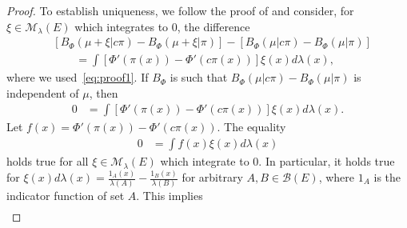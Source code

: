 \documentclass{article}
\newcommand{\cM}{\mathcal M}
\newcommand{\R}{\mathbb R}
\newcommand{\X}{E}
\newcommand{\ssp}[1]{\langle #1 \rangle}
\begin{document}
\begin{proof}
To establish uniqueness, we follow the proof of \citet[Theorem 3.1]{chen2023sampling} and consider, for $\xi\in\cM_\lambda(\X)$ which integrates to 0, the difference
\begin{align*}
     &[B_\Phi(\mu+\xi|c\pi) -B_\Phi(\mu+\xi|\pi)] - [B_\Phi(\mu|c\pi) -B_\Phi(\mu|\pi)]\\
     &\qquad =  \int [\Phi'(\pi(x))-\Phi'(c\pi(x))]\xi(x) d\lambda(x),
\end{align*}
where we used~\eqref{eq:proof1}.
If $B_\Phi$ is such that $B_\Phi(\mu|c\pi) -B_\Phi(\mu|\pi) $ is independent of $\mu$, then
\begin{align*}
    0&=\int [\Phi'(\pi(x))-\Phi'(c\pi(x))]\xi(x) d\lambda(x).
\end{align*}
Let $f(x) = \Phi'(\pi(x))-\Phi'(c\pi(x))$. The equality
\begin{align*}
    0&= \int f(x)\xi(x)d\lambda(x)
\end{align*}
holds true for all $\xi\in\cM_\lambda(\X)$ which integrate to 0. In particular, it holds true for $\xi(x)d\lambda(x) = \frac{1_A(x)}{\lambda(A)} - \frac{1_B(x)}{\lambda(B)}$ for arbitrary $A, B \in \mathcal{B}(\X)$, where $1_A$ is the indicator function of set $A$. This implies
\begin{align*}

\end{align*}
\end{proof}
\end{document}
